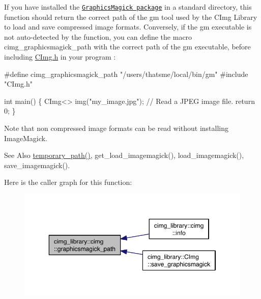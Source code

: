 If you have installed the \href{http://www.graphicsmagick.org}{\tt Graphics\-Magick package} in a standard directory, this function should return the correct path of the {\ttfamily gm} tool used by the C\-Img Library to load and save compressed image formats. Conversely, if the {\ttfamily gm} executable is not auto-\/detected by the function, you can define the macro {\ttfamily cimg\-\_\-graphicsmagick\-\_\-path} with the correct path of the {\ttfamily gm} executable, before including {\ttfamily \hyperlink{_c_img_8h_source}{C\-Img.\-h}} in your program \-: 
\begin{DoxyCode}
\textcolor{preprocessor}{#define cimg\_graphicsmagick\_path "/users/thatsme/local/bin/gm"}
\textcolor{preprocessor}{}\textcolor{preprocessor}{#include "CImg.h"}

\textcolor{keywordtype}{int} main() \{
  CImg<> img(\textcolor{stringliteral}{"my\_image.jpg"});     \textcolor{comment}{// Read a JPEG image file.}
  \textcolor{keywordflow}{return} 0;
\}
\end{DoxyCode}


Note that non compressed image formats can be read without installing Image\-Magick.

\begin{DoxySeeAlso}{See Also}
\hyperlink{namespacecimg__library_1_1cimg_a411c598d6a44291415a1e2299d2c39b1}{temporary\-\_\-path()}, get\-\_\-load\-\_\-imagemagick(), load\-\_\-imagemagick(), save\-\_\-imagemagick(). 
\end{DoxySeeAlso}


Here is the caller graph for this function\-:
\nopagebreak
\begin{figure}[H]
\begin{center}
\leavevmode
\includegraphics[width=350pt]{namespacecimg__library_1_1cimg_a427f31124296fa11e951bb2536e4e88b_icgraph}
\end{center}
\end{figure}


